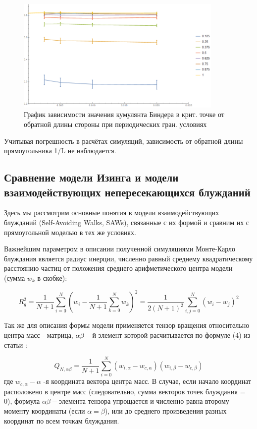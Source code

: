 \begin{figure}[!h]
    \centering
    \includegraphics[width=100mm]{Sections/Images/CumulantPBCL.png}
    \caption{График зависимости значения кумулянта Биндера в крит. точке от обратной длины стороны при периодических гран. условиях}
    \label{fig:CumulPBCL}
\end{figure}

Учитывая погрешность в расчётах симуляций, зависимость от обратной длины прямоугольника 1/L не наблюдается.

\subsection{Сравнение модели Изинга и модели взаимодействующих непересекающихся блужданий}

Здесь мы рассмотрим основные понятия в модели взаимодействующих блужданий (Self-Avoiding Walks, SAWs), связанные с их формой и сравним их с прямоугольной моделью в тех же условиях. 

Важнейшим параметром в описании полученной симуляциями Монте-Карло блуждания является радиус инерции, численно равный среднему квадратическому расстоянию частиц от положения среднего арифметического центра модели (сумма $w_{k}$ в скобке)\cite{Pelissetto}:

\begin{equation}\label{eq:Rg}
    R^{2}_{g} = \frac{1}{N+1} \sum^{N}_{i=0}\left(w_{i} - \frac{1}{N+1}\sum^{N}_{k=0}w_{k}\right)^2 = \frac{1}{2(N+1)^{2}}\sum^{N}_{i,j=0}(w_{i} - w_{j})^{2}
\end{equation}

Так же для описания формы модели применяется тензор вращения относительно центра масс - матрица, $\alpha\beta-$й элемент которой расчитывается по формуле (4) из статьи\cite{Janke_G} :

\begin{equation}\label{eq:Ten_G1}
    Q_{N,\alpha\beta} = \frac{1}{N+1} \sum^{N}_{i=0}(w_{i,\alpha} - w_{c, \alpha})(w_{i,\beta} - w_{c, \beta})
\end{equation}
где $w_{c,\alpha} - \alpha$ -я координата вектора центра масс. В случае, если начало координат расположено в центре масс (следовательно, сумма векторов точек блуждания = 0), формула $\alpha\beta-$элемента тензора упрощается и численно равна второму моменту координаты (если $\alpha = \beta$), или до среднего произведения разных координат по всем точкам блуждания.


